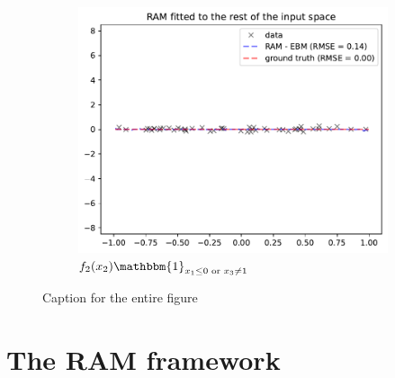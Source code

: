 \documentclass[12pt]{article}
\newcommand{\xcc}{\mathbf{x_{/s}}}
\newcommand{\when}[1]{\mathbbm{1}_{#1}}
\begin{document}
\begin{figure}[htbp]
\begin{subfigure}{0.32\textwidth}
    \end{subfigure}
    \begin{subfigure}{0.32\textwidth}
        \centering
        \includegraphics[width=\textwidth]{figures/regional_gam_subreg_2}
        \caption{\(f_2(x_2) \when{x_1 \leq 0 \text{ or } x_3 \neq 1}\)}
        \label{subfig:regional_gam_2}
    \end{subfigure}
    \caption{Caption for the entire figure}
    \label{fig:ram_example}
\end{figure}


\section{The RAM framework}


\end{document}
